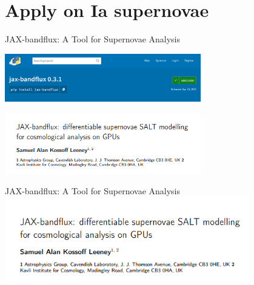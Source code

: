 \documentclass[aspectratio=169]{beamer}
\begin{document}
\section{Apply on Ia supernovae}

\begin{frame}{JAX-bandflux: A Tool for Supernovae Analysis}
  \vfill
  \begin{center}
    \includegraphics[width=0.64\textwidth]{images/jaxbandflux-pip.png}
  \end{center}
  \vfill
  \begin{center}
    \includegraphics[width=0.64\textwidth]{images/jaxbandflux-paper.png}
  \end{center}
  \vfill
\end{frame}
\begin{frame}{JAX-bandflux: A Tool for Supernovae Analysis}
  \centering \includegraphics[width=0.8\textwidth]{images/josjaxbflux.png}
\end{frame}
\end{document}
